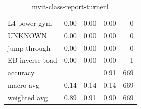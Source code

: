 \begin{table}[h!]
\begin{tabular}{|l|r|r|r|r|}
         L4-power-gym &      0.00 &     0.00 &     0.00 &        0 \\
              UNKNOWN &      0.00 &     0.00 &     0.00 &        0 \\
         jump-through &      0.00 &     0.00 &     0.00 &        0 \\
      EB inverse toad &      0.00 &     0.00 &     0.00 &        1 \\ \hline
             accuracy &           &          &     0.91 &      669 \\
            macro avg &      0.14 &     0.14 &     0.14 &      669 \\
         weighted avg &      0.89 &     0.91 &     0.90 &      669 \\
         \hline
    \end{tabular}
    \caption[Turner 1 class report]{mvit-class-report-turner1}
    \label{tbl:mvit-class-report-turner1}
\end{table}

